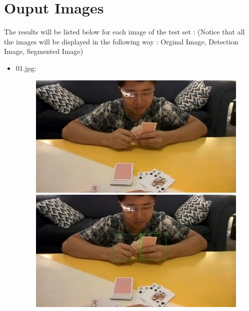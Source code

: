 \section{Ouput Images}
The results will be listed below for each image of the test set : \newline (Notice that all the images will be displayed in the following way : Orginal Image, Detection Image, Segmented Image)
\begin{itemize}
    \item 01.jpg:
        \begin{figure}[!htb]
            \begin{minipage}{0.33\textwidth}
            \centering
            \includegraphics[scale = 0.135]{images/results/original/01.jpg}
            \end{minipage}\hfill
            \begin{minipage}{0.33\textwidth}
                \centering
                \includegraphics[scale = 0.135]{images/results/detection/01_detections.jpg}
            \end{minipage}\hfill
            \begin{minipage}{0.33\textwidth}

\end{minipage}
\end{figure}
\end{itemize}
